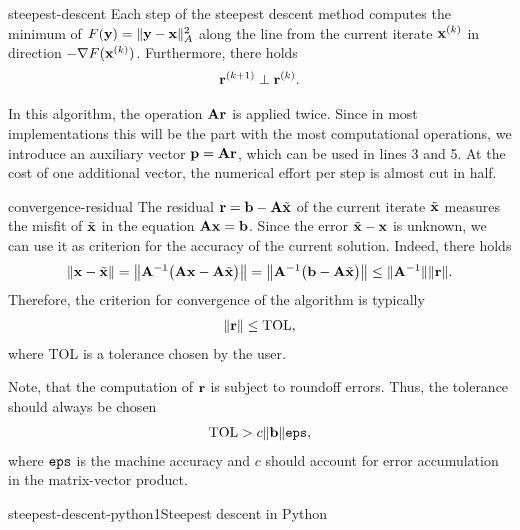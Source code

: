 \begin{Lemma}{steepest-descent}
  Each step of the steepest descent method computes the minimum of
  $F(\vy) = \norm{\vy-\vx}_A^2$ along the line from the current
  iterate $\vx^{(k)}$ in direction $-\nabla F(\vx^{(k)})$.
  Furthermore, there holds
  \begin{gather}
    \vr^{(k+1)} \perp \vr^{(k)}.
  \end{gather}
  
\end{Lemma}

\begin{remark}
  In this algorithm, the operation $\mata\vr$ is applied twice. Since
  in most implementations this will be the part with the most
  computational operations, we introduce an auxiliary vector
  $\vp = \mata\vr$, which can be used in lines 3 and 5. At the cost of
  one additional vector, the numerical effort per step is almost
  cut in half.
\end{remark}

\begin{Remark}{convergence-residual}
  The residual $\vr = \vb - \mata\tilde\vx$ of the current iterate
  $\tilde\vx$ measures the misfit of $\tilde\vx$ in the equation
  $\mata\vx = \vb$. Since the error $\tilde\vx-\vx$ is unknown, we can
  use it as criterion for the accuracy of the current
  solution. Indeed, there holds
  \begin{gather}
    \norm{\vx-\tilde\vx}
    = \norm*{\mata^{-1}\bigl(\mata\vx - \mata\tilde\vx\bigr)}
    = \norm*{\mata^{-1}\bigl(\vb - \mata\tilde\vx\bigr)}
    \le \norm{\mata^{-1}}\norm{\vr}.
  \end{gather}
  Therefore, the criterion for convergence of the algorithm is typically
  \begin{gather}
    \norm{\vr} \le \text{TOL},
  \end{gather}
  where TOL is a tolerance chosen by the user.

  Note, that the computation of $\vr$ is subject to roundoff
  errors. Thus, the tolerance should always be chosen
  \begin{gather}
    \text{TOL} > c\norm{\vb}\eps,
  \end{gather}
  where $\eps$ is the machine accuracy and $c$ should account for
  error accumulation in the matrix-vector product.
\end{Remark}

\begin{Algorithm*}{steepest-descent-python1}{Steepest descent in Python}
  
\end{Algorithm*}

